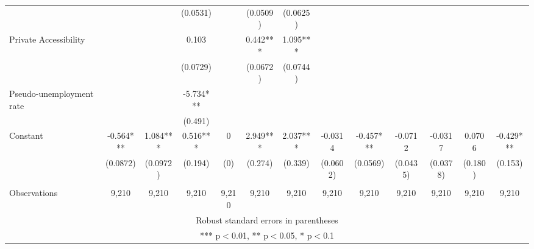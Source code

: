 \documentclass[]{article}
\begin{document}
\begin{tabular}{lcccccccccccc}
 &  &  & (0.0531) &  & (0.0509) & (0.0625) &  &  &  &  &  &  \\
Private Accessibility &  &  & 0.103 &  & 0.442*** & 1.095*** &  &  &  &  &  &  \\
 &  &  & (0.0729) &  & (0.0672) & (0.0744) &  &  &  &  &  &  \\
Pseudo-unemployment rate &  &  & -5.734*** &  &  &  &  &  &  &  &  &  \\
 &  &  & (0.491) &  &  &  &  &  &  &  &  &  \\
Constant & -0.564*** & 1.084*** & 0.516*** & 0 & 2.949*** & 2.037*** & -0.0314 & -0.457*** & -0.0712 & -0.0317 & 0.0706 & -0.429*** \\
 & (0.0872) & (0.0972) & (0.194) & (0) & (0.274) & (0.339) & (0.0602) & (0.0569) & (0.0435) & (0.0378) & (0.180) & (0.153) \\
 &  &  &  &  &  &  &  &  &  &  &  &  \\
 Observations & 9,210 & 9,210 & 9,210 & 9,210 & 9,210 & 9,210 & 9,210 & 9,210 & 9,210 & 9,210 & 9,210 & 9,210 \\ \hline
\multicolumn{13}{c}{ Robust standard errors in parentheses} \\
\multicolumn{13}{c}{ *** p$<$0.01, ** p$<$0.05, * p$<$0.1} \\
\end{tabular}
\end{document}

